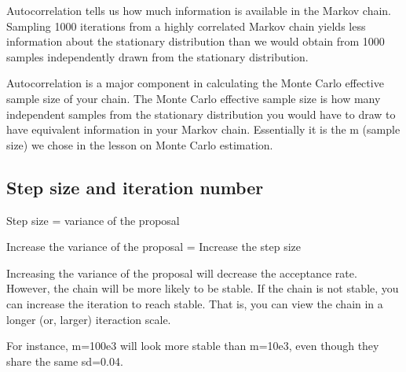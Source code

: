 \documentclass[]{book}
\begin{document}
Autocorrelation tells us how much information is available in the Markov
chain. Sampling 1000 iterations from a highly correlated Markov chain
yields less information about the stationary distribution than we would
obtain from 1000 samples independently drawn from the stationary
distribution.

Autocorrelation is a major component in calculating the Monte Carlo
effective sample size of your chain. The Monte Carlo effective sample
size is how many independent samples from the stationary distribution
you would have to draw to have equivalent information in your Markov
chain. Essentially it is the m (sample size) we chose in the lesson on
Monte Carlo estimation.

\subsection{Step size and iteration
number}\label{step-size-and-iteration-number}

Step size = variance of the proposal

Increase the variance of the proposal = Increase the step size

Increasing the variance of the proposal will decrease the acceptance
rate. However, the chain will be more likely to be stable. If the chain
is not stable, you can increase the iteration to reach stable. That is,
you can view the chain in a longer (or, larger) iteraction scale.

For instance, m=100e3 will look more stable than m=10e3, even though
they share the same sd=0.04.
\end{document}
